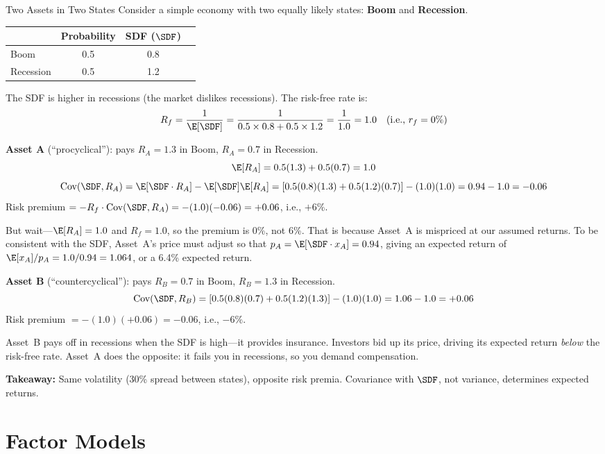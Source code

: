\begin{workedexample}{Two Assets in Two States}
Consider a simple economy with two equally likely states: \textbf{Boom} and \textbf{Recession}.

\medskip
\begin{tabular}{lccc}
\toprule
 & Probability & SDF ($\SDF$) & \\
\midrule
Boom      & 0.5 & 0.8 & \\
Recession & 0.5 & 1.2 & \\
\bottomrule
\end{tabular}

\medskip
The SDF is higher in recessions (the market dislikes recessions). The risk-free rate is:
\[
R_f = \frac{1}{\E[\SDF]} = \frac{1}{0.5 \times 0.8 + 0.5 \times 1.2} = \frac{1}{1.0} = 1.0 \quad (\text{i.e., } r_f = 0\%)
\]

\textbf{Asset A} (``procyclical''): pays $R_A = 1.3$ in Boom, $R_A = 0.7$ in Recession.
\[
\E[R_A] = 0.5(1.3) + 0.5(0.7) = 1.0
\]
\[
\text{Cov}(\SDF, R_A) = \E[\SDF \cdot R_A] - \E[\SDF]\E[R_A] = [0.5(0.8)(1.3) + 0.5(1.2)(0.7)] - (1.0)(1.0) = 0.94 - 1.0 = -0.06
\]
Risk premium $= -R_f \cdot \text{Cov}(\SDF, R_A) = -(1.0)(-0.06) = +0.06$, i.e., $+6\%$.

But wait---$\E[R_A] = 1.0$ and $R_f = 1.0$, so the premium is 0\%, not 6\%. That is because Asset~A is mispriced at our assumed returns. To be consistent with the SDF, Asset~A's price must adjust so that $p_A = \E[\SDF \cdot x_A] = 0.94$, giving an expected return of $\E[x_A]/p_A = 1.0/0.94 = 1.064$, or a 6.4\% expected return.

\textbf{Asset B} (``countercyclical''): pays $R_B = 0.7$ in Boom, $R_B = 1.3$ in Recession.
\[
\text{Cov}(\SDF, R_B) = [0.5(0.8)(0.7) + 0.5(1.2)(1.3)] - (1.0)(1.0) = 1.06 - 1.0 = +0.06
\]
Risk premium $= -(1.0)(+0.06) = -0.06$, i.e., $-6\%$.

Asset~B pays off in recessions when the SDF is high---it provides insurance. Investors bid up its price, driving its expected return \emph{below} the risk-free rate. Asset~A does the opposite: it fails you in recessions, so you demand compensation.

\textbf{Takeaway:} Same volatility (30\% spread between states), opposite risk premia. Covariance with $\SDF$, not variance, determines expected returns.
\end{workedexample}

\section{Factor Models}
\label{sec:factor-models}

